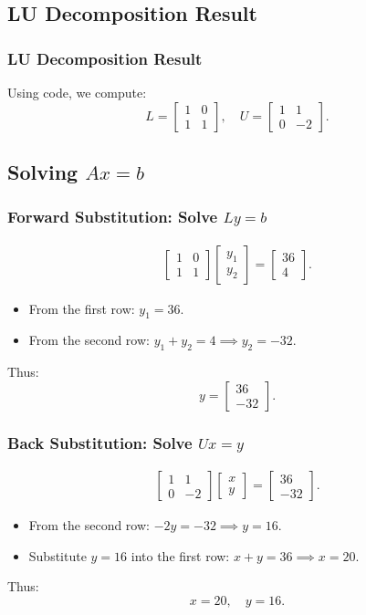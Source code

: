 \documentclass{beamer}
\numberwithin{equation}{section}
\begin{document}
\subsection{LU Decomposition Result}
\begin{frame}
\frametitle{LU Decomposition Result}
Using code, we compute:
\[
    L = \begin{bmatrix} 1 & 0 \\ 1 & 1 \end{bmatrix}, \quad
    U = \begin{bmatrix} 1 & 1 \\ 0 & -2 \end{bmatrix}.
\]
\end{frame}

\subsection{Solving $Ax = b$}
\begin{frame}
\frametitle{Forward Substitution: Solve $Ly = b$}
\begin{align*}
    \begin{bmatrix} 1 & 0 \\ 1 & 1 \end{bmatrix} \begin{bmatrix} y_1 \\ y_2 \end{bmatrix} = \begin{bmatrix} 36 \\ 4 \end{bmatrix}.
\end{align*}
\begin{itemize}
    \item From the first row: $y_1 = 36$.
    \item From the second row: $y_1 + y_2 = 4 \implies y_2 = -32$.
\end{itemize}
Thus:
\[
    y = \begin{bmatrix} 36 \\ -32 \end{bmatrix}.
\]
\end{frame}

\begin{frame}
\frametitle{Back Substitution: Solve $Ux = y$}
\begin{align*}
    \begin{bmatrix} 1 & 1 \\ 0 & -2 \end{bmatrix} \begin{bmatrix} x \\ y \end{bmatrix} = \begin{bmatrix} 36 \\ -32 \end{bmatrix}.
\end{align*}
\begin{itemize}
    \item From the second row: $-2y = -32 \implies y = 16$.
    \item Substitute $y = 16$ into the first row: $x + y = 36 \implies x = 20$.
\end{itemize}
Thus:
\[
    x = 20, \quad y = 16.
\]
\end{frame}
\end{document}
